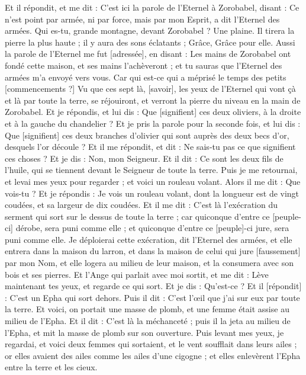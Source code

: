 \begin{multicols}{2}
Et il répondit, et me dit : C'est ici la parole de l'Eternel à Zorobabel, disant : Ce n'est point par armée, ni par force, mais par mon Esprit, a dit l'Eternel des armées.
Qui es-tu, grande montagne, devant Zorobabel ? Une plaine. Il tirera la pierre la plus haute ; il y aura des sons éclatants ; Grâce, Grâce pour elle.
Aussi la parole de l'Eternel me fut [adressée], en disant :
Les mains de Zorobabel ont fondé cette maison, et ses mains l'achèveront ; et tu sauras que l'Eternel des armées m'a envoyé vers vous.
Car qui est-ce qui a méprisé le temps des petits [commencements ?] Vu que ces sept là, [savoir], les yeux de l'Eternel qui vont çà et là par toute la terre, se réjouiront, et verront la pierre du niveau en la main de Zorobabel.
Et je répondis, et lui dis : Que [signifient] ces deux oliviers, à la droite et à la gauche du chandelier ?
Et je pris la parole pour la seconde fois, et lui dis : Que [signifient] ces deux branches d'olivier qui sont auprès des deux becs d'or, desquels l'or découle ?
Et il me répondit, et dit : Ne sais-tu pas ce que signifient ces choses ? Et je dis : Non, mon Seigneur.
Et il dit : Ce sont les deux fils de l'huile, qui se tiennent devant le Seigneur de toute la terre.
\VerseOne{}Puis je me retournai, et levai mes yeux pour regarder ; et voici un rouleau volant.
Alors il me dit : Que vois-tu ? Et je répondis : Je vois un rouleau volant, dont la longueur est de vingt coudées, et sa largeur de dix coudées.
Et il me dit : C'est là l'exécration du serment qui sort sur le dessus de toute la terre ; car quiconque d'entre ce [peuple-ci] dérobe, sera puni comme elle ; et quiconque d'entre ce [peuple]-ci jure, sera puni comme elle.
Je déploierai cette exécration, dit l'Eternel des armées, et elle entrera dans la maison du larron, et dans la maison de celui qui jure [faussement] par mon Nom, et elle logera au milieu de leur maison, et la consumera avec son bois et ses pierres.
Et l'Ange qui parlait avec moi sortit, et me dit : Lève maintenant tes yeux, et regarde ce qui sort.
Et je dis : Qu'est-ce ? Et il [répondit] : C'est un Epha qui sort dehors. Puis il dit : C'est l'œil que j'ai sur eux par toute la terre.
Et voici, on portait une masse de plomb, et une femme était assise au milieu de l'Epha.
Et il dit : C'est là la méchanceté ; puis il la jeta au milieu de l'Epha, et mit la masse de plomb sur son ouverture.
Puis levant mes yeux, je regardai, et voici deux femmes qui sortaient, et le vent soufflait dans leurs ailes ; or elles avaient des ailes comme les ailes d'une cigogne ; et elles enlevèrent l'Epha entre la terre et les cieux.

\end{multicols}

